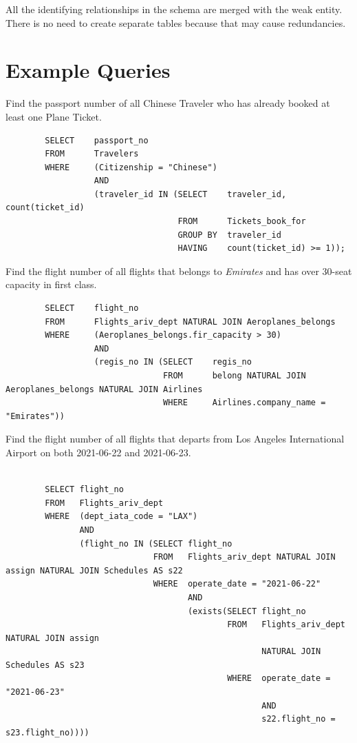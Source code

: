 \documentclass{article}
\begin{document}
	All the identifying relationships in the schema are merged with the weak entity. There is no need to create separate tables because that may cause redundancies.
	
	\section{Example Queries}
	
	\noindent Find the passport number of all Chinese Traveler who has already booked at least one Plane Ticket. 
	\begin{verbatim}
		SELECT    passport_no 
		FROM      Travelers
		WHERE     (Citizenship = "Chinese") 
		          AND 
		          (traveler_id IN (SELECT    traveler_id, count(ticket_id)
		                           FROM      Tickets_book_for
		                           GROUP BY  traveler_id
		                           HAVING    count(ticket_id) >= 1));
	\end{verbatim}
    
	\noindent Find the flight number of all flights that belongs to \textit{Emirates} and has over 30-seat capacity in first class. 
	\begin{verbatim}
		SELECT    flight_no
		FROM      Flights_ariv_dept NATURAL JOIN Aeroplanes_belongs
		WHERE     (Aeroplanes_belongs.fir_capacity > 30) 
		          AND
		          (regis_no IN (SELECT    regis_no
		                        FROM      belong NATURAL JOIN Aeroplanes_belongs NATURAL JOIN Airlines
		                        WHERE     Airlines.company_name = "Emirates"))               
	\end{verbatim}
	
	\noindent Find the flight number of all flights that departs from Los Angeles International Airport on both 2021-06-22 and 2021-06-23.
	\begin{verbatim}
		
		SELECT flight_no
		FROM   Flights_ariv_dept
		WHERE  (dept_iata_code = "LAX")
		       AND 
		       (flight_no IN (SELECT flight_no
		                      FROM   Flights_ariv_dept NATURAL JOIN assign NATURAL JOIN Schedules AS s22
		                      WHERE  operate_date = "2021-06-22"
		                             AND
		                             (exists(SELECT flight_no
		                                     FROM   Flights_ariv_dept NATURAL JOIN assign 
		                                            NATURAL JOIN Schedules AS s23
		                                     WHERE  operate_date = "2021-06-23"
		                                            AND
		                                            s22.flight_no = s23.flight_no))))     
	\end{verbatim}
	
\end{document}

